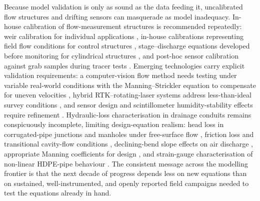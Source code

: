 Because model validation is only as sound as the data feeding it, uncalibrated
flow structures and drifting sensors can masquerade as model inadequacy.
In-house calibration of flow-measurement structures is recommended repeatedly:
weir calibration for individual applications \parencite{Christianson2019,Napierala2023},
in-house calibrations representing field flow conditions for control structures
\parencite{Katuwal2024}, stage--discharge equations developed before monitoring
for cylindrical structures \parencite{BinShokrana2021}, and post-hoc sensor
calibration against grab samples during tracer tests \parencite{deOliveira2023b}.
Emerging technologies carry explicit validation requirements: a computer-vision
flow method needs testing under variable real-world conditions with the
Manning--Strickler equation to compensate for uneven velocities
\parencite{Young2023}, hybrid RTK--rotating-laser systems address
less-than-ideal survey conditions \parencite{Freeland2014}, and sensor design
and scintillometer humidity-stability effects require refinement
\parencite{Enamorado2007,Zhang2010}. Hydraulic-loss characterisation in drainage
conduits remains conspicuously incomplete, limiting design-equation realism:
head loss in corrugated-pipe junctions and manholes under free-surface flow
\parencite{Bayat2011}, friction loss and transitional cavity-flow conditions
\parencite{Nédélec2008}, declining-bend slope effects on air discharge
\parencite{Gurklys2008}, appropriate Manning coefficients for design
\parencite{Kouchakzadeh2011}, and strain-gauge characterisation of non-linear
HDPE-pipe behaviour \parencite{Gaj2021}. The consistent message across the
modelling frontier is that the next decade of progress depends less on new
equations than on sustained, well-instrumented, and openly reported field
campaigns needed to test the equations already in hand.